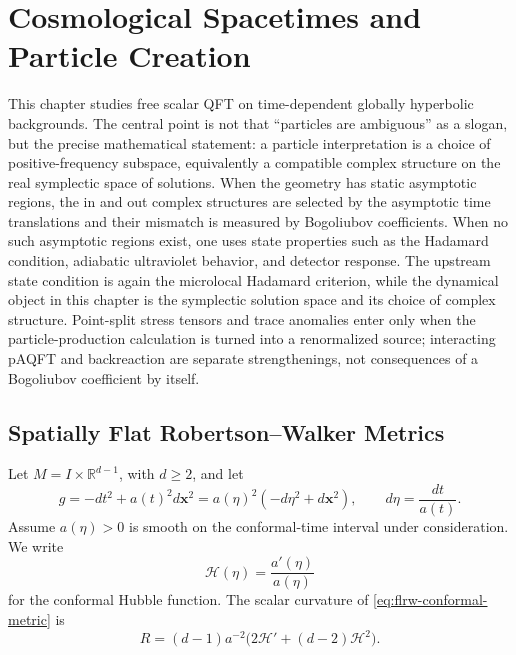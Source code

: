 \chapter{Cosmological Spacetimes and Particle Creation}
\label{ch:curved-cosmological-spacetimes-particle-creation}

\ConventionsLorentzian

This chapter studies free scalar QFT on time-dependent globally hyperbolic
backgrounds.  The central point is not that ``particles are ambiguous'' as a
slogan, but the precise mathematical statement: a particle interpretation is
a choice of positive-frequency subspace, equivalently a compatible complex
structure on the real symplectic space of solutions.  When the geometry has
static asymptotic regions, the in and out complex structures are selected by
the asymptotic time translations and their mismatch is measured by
Bogoliubov coefficients.  When no such asymptotic regions exist, one uses
state properties such as the Hadamard condition, adiabatic ultraviolet
behavior, and detector response.
The upstream state condition is again the microlocal Hadamard criterion, while
the dynamical object in this chapter is the symplectic solution space and its
choice of complex structure.  Point-split stress tensors and trace anomalies
enter only when the particle-production calculation is turned into a
renormalized source; interacting pAQFT and backreaction are separate
strengthenings, not consequences of a Bogoliubov coefficient by itself.

\section{Spatially Flat Robertson--Walker Metrics}

Let \(M=I\times\mathbb R^{d-1}\), with \(d\geq2\), and let
\begin{equation}
  g=-dt^2+a(t)^2d\mathbf x^2
  =
  a(\eta)^2(-d\eta^2+d\mathbf x^2),
  \qquad
  d\eta=\frac{dt}{a(t)}.
  \label{eq:flrw-conformal-metric}
\end{equation}
Assume \(a(\eta)>0\) is smooth on the conformal-time interval under
consideration.  We write
\begin{equation}
  \mathcal H(\eta)=\frac{a'(\eta)}{a(\eta)}
  \label{eq:conformal-hubble-definition}
\end{equation}
for the conformal Hubble function.  The scalar curvature of
\eqref{eq:flrw-conformal-metric} is
\begin{equation}
  R
  =
  (d-1)a^{-2}\bigl(2\mathcal H'+(d-2)\mathcal H^2\bigr).
  \label{eq:flrw-scalar-curvature}
\end{equation}

